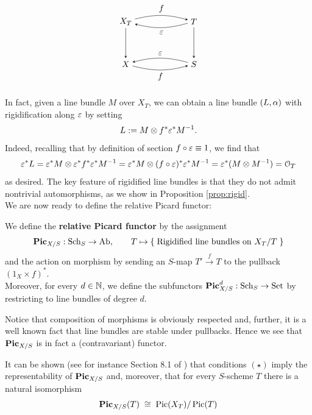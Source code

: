 	\begin{equation*}
	\begin{tikzpicture}[node distance=5em, auto] %
		\node (A) 															{$X_T$};
		\node (B) 	[right of=A, xshift=3em]		{$T$};
	  \node (C) 	[below of=A] 								{$X$};
	  \node (D) 	[right of=C, xshift=3em] 		{$S$};
	  \draw[-stealth, bend left=15, looseness=1]						(A)		to node {$f$} 			(B);
	  \draw[-stealth, bend left=15, looseness=1]						(B)		to node {$\eps$} 	(A);
	  \draw[-stealth]																				(A)		to node {} (C);
	  \draw[-stealth]																				(B)		to node {} (D);
	  \draw[-stealth, bend right=15, looseness=1, swap]			(D)		to node {$\eps$}		(C);
	  \draw[-stealth, bend right=15, looseness=1, swap]			(C)		to node {$f$} 			(D);
	\end{tikzpicture}
	\end{equation*}

	In fact, given a line bundle $M$ over $X_T$, we can obtain a line bundle $(L,\alpha)$ with rigidification along $\varepsilon$ by setting
	$$ L:= M\otimes f^* \varepsilon^* M^{-1} . $$
	Indeed, recalling that by definition of section $f\circ\varepsilon \equiv 1$, we find that
	$$ 
	\varepsilon^* L 
	= 
	\varepsilon^*M\otimes \varepsilon^* f^* \varepsilon^* M^{-1} 
	= 
	\varepsilon^*M\otimes (f\circ\varepsilon)^* \varepsilon^* M^{-1}
	=
	\varepsilon^* (M\otimes M^{-1})
	=
	\mathcal{O}_T  
	$$
	as desired.
	The key feature of rigidified line bundles is that they do not admit nontrivial automorphisms, as we show in Proposition \ref{prop:rigid}.\\

	We are now ready to define the relative Picard functor:
	\begin{defi}
		We define the \textbf{relative Picard functor} by the assignment
		$$ \operatorname{\mathbf{Pic}}_{X/S}:\operatorname{Sch}_S \to \operatorname{Ab}, \qquad T \mapsto \left\{\;  \text{Rigidified line bundles}\text{ on } X_T/T  \; \right\} $$
		and the action on morphism by sending an $S$-map $T'\overset{f}\to T$ to the pullback $(1_X\times f)^*$.\\ 
		Moreover, for every $d\in \mathbb{N}$, we define the subfunctors $\operatorname{\mathbf{Pic}}_{X/S}^d:\operatorname{Sch}_S \to \operatorname{Set}$ by restricting to line bundles of degree $d$.
	\end{defi}
	\begin{rema}
		Notice that composition of morphisms is obviously respected and, further, it is a well known fact that line bundles are stable under pullbacks. Hence we see that $\operatorname{\mathbf{Pic}}_{X/S}$ is in fact a (contravariant) functor.
	\end{rema}	
	It can be shown (see for instance Section 8.1 of \cite{BOSCH}) that conditions $(\star)$ imply the representability of $\operatorname{\mathbf{Pic}}_{X/S}$ and, moreover, that for every $S$-scheme $T$ there is a natural isomorphism
	\begin{equation}\label{eq:PicXS}
		\operatorname{\mathbf{Pic}}_{X/S}(T) \;\cong\; \operatorname{Pic}(X_T) / \operatorname {\operatorname{Pic}}(T)
	\end{equation}


